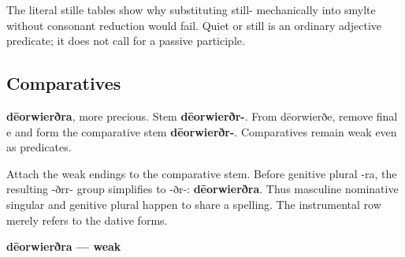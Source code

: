 The literal stille tables show why substituting still- mechanically into smylte without consonant reduction would fail. Quiet or still is an ordinary adjective predicate; it does not call for a passive participle.

\subsection*{Comparatives}

\textbf{dēorwierðra}, more precious. Stem \textbf{dēorwierðr-}. From dēorwierðe, remove final e and form the comparative stem \textbf{dēorwierðr-}. Comparatives remain weak even as predicates.

Attach the weak endings to the comparative stem. Before genitive plural -ra, the resulting -ðrr- group simplifies to -ðr-: \textbf{dēorwierðra}. Thus masculine nominative singular and genitive plural happen to share a spelling. The instrumental row merely refers to the dative forms.

\textbf{dēorwierðra — weak}


